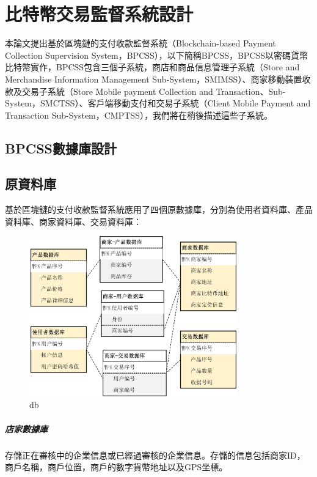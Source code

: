 
\chapter{比特幣交易監督系統設計}
本論文提出基於區塊鏈的支付收款監督系統（Blockchain-based Payment Collection Supervision System，BPCSS），以下簡稱BPCSS，BPCSS以密碼貨幣比特幣實作，BPCSS包含三個子系統，商店和商品信息管理子系統（Store and Merchandise Information Management Sub-System，SMIMSS）、商家移動裝置收款及交易子系統（Store Mobile payment Collection and Transaction、Sub-System，SMCTSS）、客戶端移動支付和交易子系統（Client Mobile Payment and Transaction Sub-System，CMPTSS），我們將在稍後描述這些子系統。

	\section{BPCSS數據庫設計}
		\section{原資料庫}
		基於區塊鏈的支付收款監督系統應用了四個原數據庫，分別為使用者資料庫、產品資料庫、商家資料庫、交易資料庫：
		\begin{figure}[h]
			\centering
			\includegraphics[width = 0.8\textwidth]{db.png}
			\caption{db}\label{db}
		\end{figure}

			\paragraph{店家數據庫}存儲正在審核中的企業信息或已經過審核的企業信息。存儲的信息包括商家ID，商戶名稱，商戶位置，商戶的數字貨幣地址以及GPS坐標。
